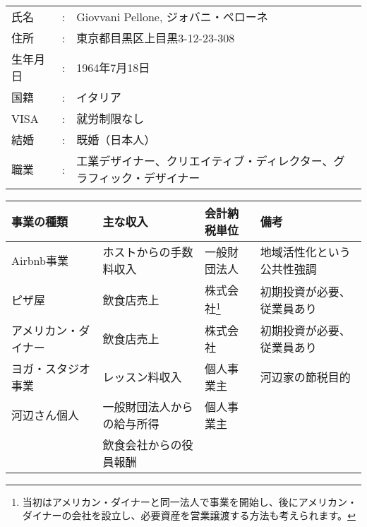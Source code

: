 \subsection{}

\begin{coloritemize}
\begin{spacing}{0.95}
  \item 
  \item 
  \item 
  \item 
\end{spacing}
\end{coloritemize}

\begin{table}[h]
  \begin{tabular}{lcp{28em}}
    氏名 & : & Giovvani Pellone, ジォバニ・ペローネ \\
    住所 & : & 東京都目黒区上目黒3-12-23-308 \\
    生年月日 & : & 1964年7月18日 \\
    国籍 & : & イタリア \\
    VISA & : & 就労制限なし \\
    結婚 & : & 既婚（日本人） \\
    職業 & : & 工業デザイナー、クリエイティブ・ディレクター、グラフィック・デザイナー \\
  \end{tabular}
\end{table}

\begin{minipage}{120mm}
  \begin{tabular}{llll}
\hline
 事業の種類   & 主な収入 & 会計納税単位 & 備考 \\
\hline
  Airbnb事業 & ホストからの手数料収入 & 一般財団法人 & 地域活性化という公共性強調 \\
  ピザ屋 & 飲食店売上 & 株式会社\footnote{当初はアメリカン・ダイナーと同一法人で事業を開始し、後にアメリカン・ダイナーの会社を設立し、必要資産を営業譲渡する方法も考えられます。} & 初期投資が必要、従業員あり \\
  アメリカン・ダイナー & 飲食店売上 & 株式会社 & 初期投資が必要、従業員あり \\
  ヨガ・スタジオ事業 & レッスン料収入 & 個人事業主 & 河辺家の節税目的 \\
  河辺さん個人 & 一般財団法人からの給与所得 & 個人事業主 & \\
  & 飲食会社からの役員報酬 &  & \\
  \hline
  \end{tabular}
\end{minipage}